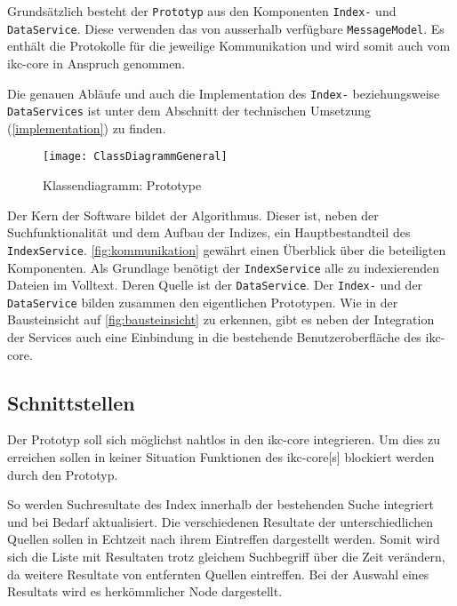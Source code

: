 Grundsätzlich besteht der \texttt{Prototyp} aus den Komponenten \texttt{Index-} und \texttt{DataService}. Diese verwenden das von ausserhalb ver\-füg\-bar\-e \texttt{MessageModel}. Es enthält die Protokolle für die jeweilige Kommunikation und wird somit auch vom \gls{ikc-core} in Anspruch genommen.

Die genauen Abläufe und auch die Implementation des \texttt{Index-} beziehungsweise \texttt{DataServices} ist unter dem Abschnitt der technischen Umsetzung (\autoref{implementation}) zu finden.

    \begin{figure}[H]
    \centering
    \texttt{[image: ClassDiagrammGeneral]}
    \caption{Klassendiagramm: Prototype}
    \label{fig:prototypeClassDiagram-easy}
    \end{figure}

Der Kern der Software bildet der Algorithmus. Dieser ist, neben der Suchfunktionalität und dem Aufbau der Indizes, ein Hauptbestandteil des \texttt{IndexService}. \autoref{fig:kommunikation} gewährt einen Überblick über die beteiligten Komponenten. Als Grundlage benötigt der \texttt{In\-dex\-Ser\-vice} alle zu indexierenden Dateien im Volltext. Deren Quelle ist der \texttt{Data\-Ser\-vice}. Der \texttt{Index-} und der \texttt{DataService} bilden zusammen den eigentlichen Prototypen. Wie in der Bausteinsicht auf \autoref{fig:bausteinsicht} zu erkennen, gibt es neben der Integration der Services auch eine Einbindung in die bestehende Benutzeroberfläche des \gls{ikc-core}.


\subsection{Schnittstellen}


Der Prototyp soll sich möglichst nahtlos in den \gls{ikc-core} integrieren. Um dies zu erreichen sollen in keiner Situation Funktionen des \gls{ikc-core}[s] blockiert werden durch den Prototyp. 

So werden Suchresultate des Index innerhalb der bestehenden Suche integriert und bei Bedarf aktualisiert. Die verschiedenen Resultate der unterschiedlichen Quellen sollen in Echtzeit nach ihrem Eintreffen dargestellt werden. Somit wird sich die Liste mit Resultaten trotz gleichem Suchbegriff über die Zeit verändern, da weitere Resultate von entfernten Quellen eintreffen. Bei der Auswahl eines Resultats wird es herkömmlicher Node dargestellt. 

